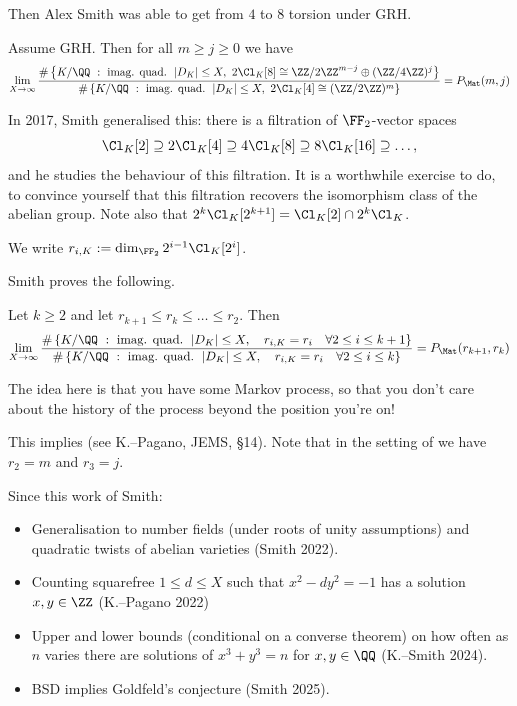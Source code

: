 \documentclass{lecturenotes}
\newcommand{\mat}{\Mat}
\numberwithin{equation}{section}
\begin{document}
Then Alex Smith was able to get from $4$ to $8$ torsion under GRH.
\begin{theorem}[Smith, 2016]\label{thm:Smith16}
    Assume GRH.  Then for all $m\geq j\geq 0$ we have
    \[\lim_{X\to\infty}\frac{\#\set{K/\QQ~:~\textnormal{imag. quad. }\abs{D_K}\leq X,\ 2\Cl_K[8]\cong \ZZ/2\ZZ^{m-j}\oplus (\ZZ/4\ZZ)^j}}{\#\set{K/\QQ~:~\textnormal{imag. quad. }\abs{D_K}\leq X,\ 2\Cl_K[4]\cong (\ZZ/2\ZZ)^{m} }}=P_{\mat}(m,j)\]
\end{theorem}

In 2017, Smith generalised this: there is a filtration of $\FF_2$-vector spaces
\[\Cl_K[2]\supseteq 2\Cl_K[4]\supseteq 4\Cl_K[8]\supseteq 8\Cl_K[16]\supseteq \dots,\]
and he studies the behaviour of this filtration.  It is a worthwhile exercise to do, to convince yourself that this filtration recovers the isomorphism class of the abelian group.  Note also that $2^{k}\Cl_K[2^{k+1}]=\Cl_K[2]\cap 2^{k}\Cl_K$.

\begin{definition}
    We write $r_{i,K}:=\dim_{\FF_2}2^{i-1}\Cl_K[2^i]$.
\end{definition}
Smith proves the following.

\begin{theorem}[Smith, 2017]\label{thm:smith}
    Let $k\geq 2$ and let $r_{k+1}\leq r_{k}\leq \dots\leq r_2$.  Then 
    \[\lim_{X\to\infty}\frac{\#\set{K/\QQ~:~\textnormal{imag. quad. }\abs{D_K}\leq X,\quad r_{i,K}=r_i\quad \forall 2\leq i\leq k+1}}{\#\set{K/\QQ~:~\textnormal{imag. quad. }\abs{D_K}\leq X,\quad r_{i,K}=r_i\quad \forall 2\leq i\leq k }}=P_{\mat}(r_{k+1},r_{k})\]
\end{theorem}
The idea here is that you have some Markov process, so that you don't care about the history of the process beyond the position you're on!

\begin{rem}
    This implies  (see K.--Pagano, JEMS, \S14).  Note that in the setting of  we have $r_{2}=m$ and $r_{3}=j$.
\end{rem}

Since this work of Smith:
\begin{itemize}
    \item Generalisation to number fields (under roots of unity assumptions) and quadratic twists of abelian varieties (Smith 2022). 
    \item Counting squarefree $1\leq d\leq X$ such that $x^2-dy^2=-1$ has a solution $x,y\in\ZZ$ (K.--Pagano 2022)
    \item Upper and lower bounds (conditional on a converse theorem) on how often as $n$ varies there are solutions of $x^3+y^3=n$ for $x,y\in\QQ$ (K.--Smith 2024).
    \item BSD implies Goldfeld's conjecture (Smith 2025).
\end{itemize}
\end{document}
